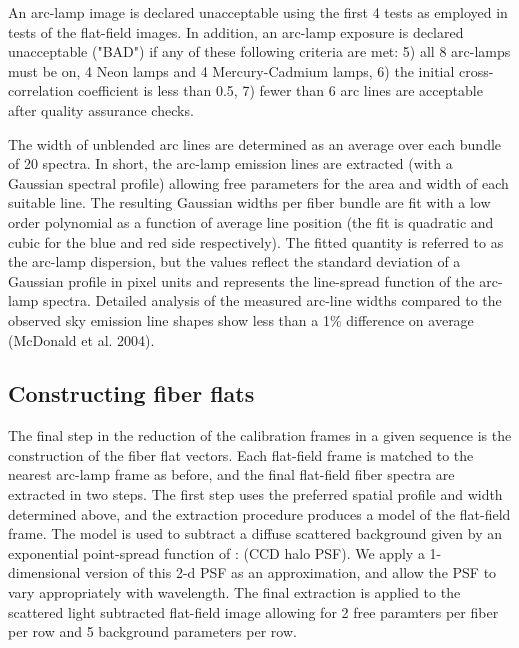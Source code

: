 \documentclass[12pt,preprint]{aastex}
\begin{document}
An arc-lamp image is declared unacceptable using the first 4 tests as employed
in tests of the flat-field images.  In addition, an arc-lamp exposure
is declared unacceptable ("BAD") if any of these following criteria are met:
5) all 8 arc-lamps must be on, 4 Neon lamps and 4 Mercury-Cadmium lamps,
6) the initial cross-correlation coefficient is less than 0.5,
7) fewer than 6 arc lines are acceptable after quality assurance checks.

The width of unblended arc lines are determined as an average over
each bundle of 20 spectra.  In short, the arc-lamp emission lines 
are extracted (with a Gaussian spectral profile) 
allowing free parameters for the area and width of each suitable line.
The resulting Gaussian widths per fiber bundle are fit 
with a low order polynomial as a function of average line position
(the fit is quadratic and cubic for the blue and red side respectively).
The fitted quantity is referred to as the arc-lamp dispersion,
but the values reflect the standard deviation of a Gaussian 
profile in pixel units and represents the line-spread function of the 
arc-lamp spectra.  Detailed analysis of the measured arc-line widths
compared to the observed sky emission line shapes show less than a 1\%
difference on average (McDonald et al. 2004). 


\subsection{Constructing fiber flats}

The final step in the reduction of the calibration frames in a given
sequence is the construction of the fiber flat vectors.  Each flat-field
frame is matched to the nearest arc-lamp frame as before, and the
final flat-field fiber spectra are extracted in two steps.  The first
step uses the preferred spatial profile and width determined above,
and the extraction procedure produces a model of the flat-field frame.
The model is used to subtract a diffuse scattered background given
by an exponential point-spread function of :  (CCD halo PSF).
We apply a 1-dimensional version of this 2-d PSF as an approximation,
and allow the PSF to vary appropriately with wavelength.
The final extraction is applied to the scattered light subtracted flat-field
image allowing for 2 free paramters per fiber per row and 
5 background parameters per row.
\end{document}
